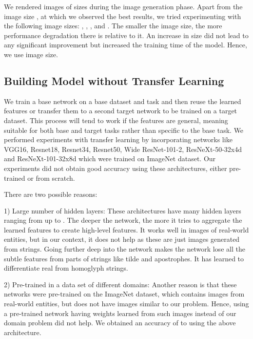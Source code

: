 \documentclass[letterpaper]{article} \usepackage{aaai22}  \usepackage{times}  \usepackage{helvet}  \usepackage{courier}  \usepackage[hyphens]{url}  \usepackage{graphicx} \urlstyle{rm} \def\UrlFont{\rm}  \usepackage{natbib}  \usepackage{caption} \DeclareCaptionStyle{ruled}{labelfont=normalfont,labelsep=colon,strut=off} \frenchspacing  \setlength{\pdfpagewidth}{8.5in}  \setlength{\pdfpageheight}{11in}  \usepackage{algorithm}
\begin{document}
We rendered images of sizes  during the image generation phase. Apart from the image size , at which we observed the best results, we tried experimenting with the following image sizes: , , , and . The smaller the image size, the more performance degradation there is relative to it. An increase in size did not lead to any significant improvement but increased the training time of the model. Hence, we use  image size.

\subsection{Building Model without Transfer Learning}
We train a base network on a base dataset and task and then reuse the learned features or transfer them to a second target network to be trained on a target dataset. This process will tend to work if the features are general, meaning suitable for both base and target tasks rather than specific to the base task. We performed experiments with transfer learning\cite{pan2009survey} by incorporating networks like VGG16\cite{simonyan2014very}, Resnet18\cite{he2016deep}, Resnet34, Resnet50, Wide ResNet-101-2, ResNeXt-50-32x4d and ResNeXt-101-32x8d which were trained on ImageNet\cite{deng2009imagenet} dataset. Our experiments did not obtain good accuracy using these architectures, either pre-trained or from scratch.

There are two possible reasons: 

1) Large number of hidden layers: These architectures have many hidden layers ranging from  up to . The deeper the network, the more it tries to aggregate the learned features to create high-level features. It works well in images of real-world entities, but in our context, it does not help as these are just images generated from strings. Going further deep into the network makes the network lose all the subtle features from parts of strings like tilde and apostrophes. It has learned to differentiate real from homoglyph strings. 

2) Pre-trained in a data set of different domains: Another reason is that these networks were pre-trained on the ImageNet dataset, which contains images from real-world entities, but does not have images similar to our problem. Hence, using a pre-trained network having weights learned from such images instead of our domain problem did not help. We obtained an accuracy of  to  using the above architecture.
\end{document}
